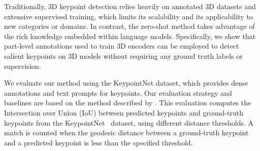Traditionally, 3D keypoint detection relies heavily on annotated 3D datasets and extensive supervised training, which limits its scalability and its applicability to new categories or domains. In contrast, the zero-shot method takes advantage of the rich knowledge embedded within language models. Specifically, we show that part-level annotations used to train 3D encoders can be employed to detect salient keypoints on 3D models without requiring any ground truth labels or supervision.

We evaluate our method using the KeypointNet dataset, which provides dense annotations and text prompts for keypoints. Our evaluation strategy and baselines are based on the method described by 
\citet{gong2025zerokey}. This evaluation computes the Intersection over Union (IoU) between predicted keypoints and ground-truth keypoints from the KeypointNet~\cite{you2020keypointnet} dataset, using different distance thresholds. A match is counted when the geodesic distance between a ground-truth keypoint and a predicted keypoint is less than the specified threshold.

